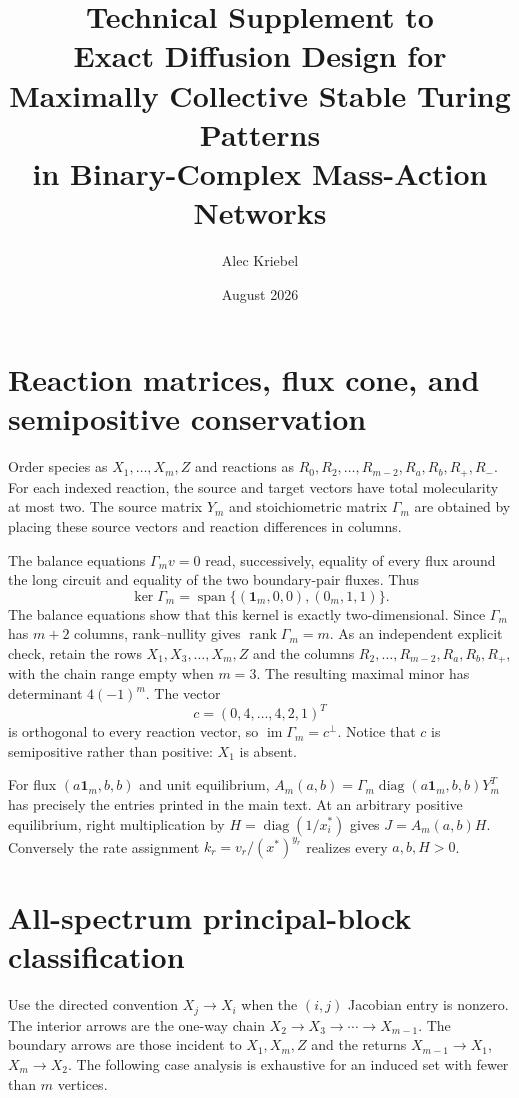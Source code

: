 \documentclass[10pt]{article}
\title{Technical Supplement to\\[0.2em]
\large Exact Diffusion Design for Maximally Collective Stable Turing Patterns\\
\normalsize in Binary-Complex Mass-Action Networks}
\author{Alec Kriebel}
\date{August 2026}
\newcommand{\diag}{\operatorname{diag}}
\newcommand{\1}{\mathbf1}
\newcommand{\rank}{\operatorname{rank}}
\newcommand{\im}{\operatorname{im}}
\begin{document}
\maketitle
\tableofcontents

\section{Reaction matrices, flux cone, and semipositive conservation}

Order species as $X_1,\ldots,X_m,Z$ and reactions as
$R_0,R_2,\ldots,R_{m-2},R_a,R_b,R_+,R_-$.  For each indexed reaction, the
source and target vectors have total molecularity at most two.  The source
matrix $Y_m$ and stoichiometric matrix $\Gamma_m$ are obtained by placing
these source vectors and reaction differences in columns.

The balance equations $\Gamma_mv=0$ read, successively, equality of every
flux around the long circuit and equality of the two boundary-pair fluxes.
Thus
\[
 \ker\Gamma_m=
 \operatorname{span}\{(\1_m,0,0),(0_m,1,1)\}.
\]
The balance equations show that this kernel is exactly two-dimensional.
Since $\Gamma_m$ has $m+2$ columns, rank--nullity gives
$\rank\Gamma_m=m$.  As an independent explicit check, retain the rows
$X_1,X_3,\ldots,X_m,Z$ and the columns
$R_2,\ldots,R_{m-2},R_a,R_b,R_+$, with the chain range empty when $m=3$.
The resulting maximal minor has determinant $4(-1)^m$.
The vector
\[
 c=(0,4,\ldots,4,2,1)^T
\]
is orthogonal to every reaction vector, so $\im\Gamma_m=c^\perp$.
Notice that $c$ is semipositive rather than positive: $X_1$ is absent.

For flux $(a\1_m,b,b)$ and unit equilibrium,
$A_m(a,b)=\Gamma_m\diag(a\1_m,b,b)Y_m^T$ has precisely the entries printed in
the main text.  At an arbitrary positive equilibrium, right multiplication by
$H=\diag(1/x_i^*)$ gives $J=A_m(a,b)H$.  Conversely the rate assignment
$k_r=v_r/(x^*)^{y_r}$ realizes every $a,b,H>0$.

\section{All-spectrum principal-block classification}

Use the directed convention $X_j\to X_i$ when the $(i,j)$ Jacobian entry is
nonzero.  The interior arrows are the one-way chain
$X_2\to X_3\to\cdots\to X_{m-1}$.  The boundary arrows are those incident to
$X_1,X_m,Z$ and the returns $X_{m-1}\to X_1$, $X_m\to X_2$.  The following
case analysis is exhaustive for an induced set with fewer than $m$ vertices.
\end{document}
